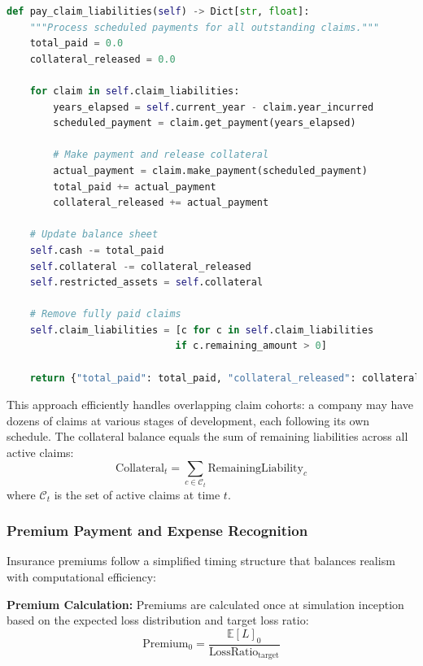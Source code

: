 \documentclass[11pt,letterpaper]{article}
\newcommand{\E}{\mathbb{E}}
\begin{document}
\begin{lstlisting}[language=Python, caption={Annual Claim Payment Processing (simplified)}, label={lst:pay-claims}]
def pay_claim_liabilities(self) -> Dict[str, float]:
    """Process scheduled payments for all outstanding claims."""
    total_paid = 0.0
    collateral_released = 0.0

    for claim in self.claim_liabilities:
        years_elapsed = self.current_year - claim.year_incurred
        scheduled_payment = claim.get_payment(years_elapsed)

        # Make payment and release collateral
        actual_payment = claim.make_payment(scheduled_payment)
        total_paid += actual_payment
        collateral_released += actual_payment

    # Update balance sheet
    self.cash -= total_paid
    self.collateral -= collateral_released
    self.restricted_assets = self.collateral

    # Remove fully paid claims
    self.claim_liabilities = [c for c in self.claim_liabilities
                             if c.remaining_amount > 0]

    return {"total_paid": total_paid, "collateral_released": collateral_released}
\end{lstlisting}

This approach efficiently handles overlapping claim cohorts: a company may have dozens of claims at various stages of development, each following its own schedule. The collateral balance equals the sum of remaining liabilities across all active claims:
\begin{equation}
\text{Collateral}_t = \sum_{c \in \mathcal{C}_t} \text{RemainingLiability}_c
\end{equation}
where $\mathcal{C}_t$ is the set of active claims at time $t$.

\subsubsection{Premium Payment and Expense Recognition}

Insurance premiums follow a simplified timing structure that balances realism with computational efficiency:

\vspace{\baselineskip}

\textbf{Premium Calculation:} Premiums are calculated once at simulation inception based on the expected loss distribution and target loss ratio:
\begin{equation}
\text{Premium}_0 = \frac{\E[L]_0}{\text{LossRatio}_{\text{target}}}
\end{equation}
\end{document}
